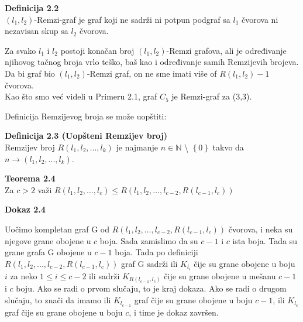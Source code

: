 \documentclass[12pt,a4paper]{article}
\begin{document}
	\begin{mdframed}
	{\noindent\fontsize{12pt}{12pt}\textbf{Definicija 2.2}}\\
	$(l_1, l_2)$-Remzi-graf je graf koji ne sadrži ni potpun podgraf sa $l_1$ čvorova ni nezavisan skup sa $l_2$ čvorova.
	
	\end{mdframed}
	
	Za svako $l_1$ i $l_2$ postoji konačan broj $(l_1, l_2)$-Remzi grafova, ali je određivanje njihovog tačnog broja vrlo teško, baš kao i određivanje samih Remzijevih brojeva. Da bi graf bio $(l_1, l_2)$-Remzi graf, on ne sme imati više of $R(l_1, l_2)-1$ čvorova.\\
	Kao što smo već videli u Primeru 2.1, graf $C_5$ je Remzi-graf za (3,3).
	
	
	

	\noindent Definicija Remzijevog broja se može uopštiti: 	
	
	\begin{mdframed}
	\vspace{0.4em}
	
	{\fontsize{12pt}{12pt}\textbf{Definicija 2.3 (Uopšteni Remzijev broj)}}
	\\
	
	\vspace{-0.8em}
	Remzijev broj $R(l_{1}, l_{2}, ... , l_{k})$ je najmanje $n \in \mathbb{N}$ \textbackslash {} $\left\lbrace 0\right\rbrace $ takvo da $n\rightarrow(l_{1}, l_{2},  ... , l_{k})$.
	\end{mdframed}
	
	{\noindent\fontsize{12pt}{12pt}\textbf{Teorema 2.4}}
	\vspace{0.4em}
	\\
	Za $c>2$ važi $R(l_1, l_2, ... , l_c) \leq R(l_1, l_2, ... , l_{c-2}, R(l_{c-1}, l_c))$
	
	\vspace{0.3em}
	
	{\noindent\fontsize{12pt}{12pt}\textbf{Dokaz 2.4}}
	\vspace{0.4em}
	
	\noindent Uočimo kompletan graf G od $R(l_1, l_2, ... , l_{c-2}, R(l_{c-1}, l_c))$ čvorova, i neka su njegove grane obojene u $c$ boja. Sada zamislimo da su $c-1$ i $c$ ista boja. Tada su grane grafa G obojene u $c-1$ boja. Tada po definiciji  $R(l_1, l_2, ... , l_{c-2}, R(l_{c-1}, l_c))$ graf G sadrži ili $K_{l_i}$ čije su grane obojene u boju $i$ za neko $1 \leq i \leq c-2$ ili sadrži $K_{R(l_{c-1}, l_c)}$ čije su grane obojene u mešanu $c-1$ i $c$ boju. Ako se radi o prvom slučaju, to je kraj dokaza. Ako se radi o drugom slučaju, to znači da imamo ili $K_{l_{c-1}}$ graf čije su grane obojene u boju $c-1$, ili $K_{l_{c}}$ graf čije su grane obojene u boju $c$, i time je dokaz završen.
	
\end{document}
